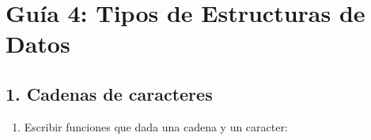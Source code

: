\documentclass[
  letterpaper,
  DIV=11,
  numbers=noendperiod]{scrreprt}
\begin{document}
\section*{Guía 4: Tipos de Estructuras de
Datos}\label{guuxeda-4-tipos-de-estructuras-de-datos}


\subsection*{1. Cadenas de caracteres}\label{cadenas-de-caracteres-1}

\begin{enumerate}
\def\labelenumi{\arabic{enumi}.}
\item
  Escribir funciones que dada una cadena y un caracter:


\end{enumerate}
\end{document}
